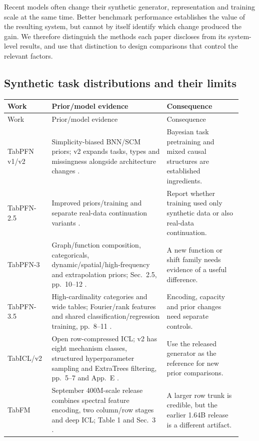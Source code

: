 \documentclass[11pt]{article}
\begin{document}
Recent models often change their synthetic generator, representation and training scale at the same time. Better benchmark performance establishes the value of the resulting system, but cannot by itself identify which change produced the gain. We therefore distinguish the methods each paper discloses from its system-level results, and use that distinction to design comparisons that control the relevant factors.

\subsection{Synthetic task distributions and their limits}

\begin{longtable}{@{}p{0.17\linewidth}p{0.46\linewidth}p{0.30\linewidth}@{}}
\toprule Work & Prior/model evidence & Consequence\\\midrule\endfirsthead
\toprule Work & Prior/model evidence & Consequence\\\midrule\endhead
TabPFN v1/v2 & Simplicity-biased BNN/SCM priors; v2 expands tasks, types and missingness alongside architecture changes \cite{tabpfn,tabpfn2}. & Bayesian task pretraining and mixed causal structures are established ingredients.\\
TabPFN-2.5 & Improved priors/training and separate real-data continuation variants \cite{tabpfn25}. & Report whether training used only synthetic data or also real-data continuation.\\
TabPFN-3 & Graph/function composition, categoricals, dynamic/spatial/high-frequency and extrapolation priors; Sec.\ 2.5, pp.\ 10--12 \cite{tabpfn3}. & A new function or shift family needs evidence of a useful difference.\\
TabPFN-3.5 & High-cardinality categories and wide tables; Fourier/rank features and shared classification/regression training, pp.\ 8--11 \cite{tabpfn35}. & Encoding, capacity and prior changes need separate controls.\\
TabICL/v2 & Open row-compressed ICL; v2 has eight mechanism classes, structured hyperparameter sampling and ExtraTrees filtering, pp.\ 5--7 and App.\ E \cite{tabicl,tabicl2}. & Use the released generator as the reference for new prior comparisons.\\
TabFM & September 400M-scale release combines spectral feature encoding, two column/row stages and deep ICL; Table 1 and Sec.\ 3 \cite{tabfm}. & A larger row trunk is credible, but the earlier 1.64B release is a different artifact.\\

\end{longtable}
\end{document}
